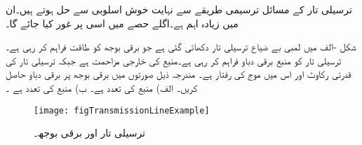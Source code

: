 ترسیلی تار کے مسائل ترسیمی طریقے سے نہایت خوش اسلوبی سے حل ہوتے ہیں۔ان میں  زیادہ اہم ہے۔اگلے حصے میں اسی پر غور کیا جائے گا۔

شکل -الف میں  لمبی بے ضیاع ترسیلی تار دکھائی گئی ہے جو  برقی بوجھ کو طاقت فراہم کر رہی ہے۔ترسیلی تار کو منبع  برقی دباو فراہم کر رہی ہے۔منبع کی خارجی مزاحمت  ہے جبکہ ترسیلی تار کی قدرتی رکاوٹ 
 اور اس میں موج کی رفتار  ہے۔ مندرجہ ذیل صورتوں میں برقی بوجھ پر برقی دباو  حاصل کریں۔ الف) منبع کی تعدد  ہے۔ ب) منبع کی تعدد  ہے ۔
\begin{figure}
\centering
\texttt{[image: figTransmissionLineExample]}
\caption{ترسیلی تار اور برقی بوجھ۔}
\label{شکل_ترسیلی_تار_بار_بردار}
\end{figure}

